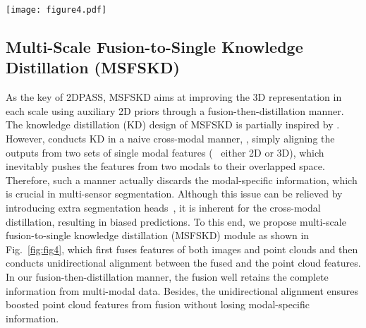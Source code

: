 \documentclass[runningheads]{llncs}
\begin{document}
	
	\begin{figure*}[t]
		\begin{centering}
			\texttt{[image: figure4.pdf]}
			\caption{Internal structure of \textbf{Multi-Scale Fusion-to-Single Knowledge Distillation (MSFSKD)}, which consists of the modality fusion and Modality-Preserving KD. For each scale, modality fusion is first ultilized to achieve an enhanced multi-modality feature $\hat{F}^{2D3D_e}_l$. Afterwards, the enhanced feature $\hat{F}^{2D3D_e}_l$ promotes the 3D representation $\hat{F}^{3D_{e}}_l$ through the uni-directional Modality-Preserving KD.
			}
			\label{fig:fig4}
		\end{centering}	
	\end{figure*}
	
	
	
	
	\subsection{Multi-Scale Fusion-to-Single Knowledge Distillation (MSFSKD)}
	\label{sec:ms}
	As the key of 2DPASS, MSFSKD aims at improving the 3D representation in each scale using auxiliary 2D priors through a fusion-then-distillation manner.
The knowledge distillation (KD) design of MSFSKD is partially inspired by \cite{jaritz2020xmuda}.
However, \cite{jaritz2020xmuda} conducts KD in a naive cross-modal manner, \ie, simply aligning the outputs from two sets of single modal features (\ie~ either 2D or 3D), which inevitably pushes the features from two modals to their overlapped space.
Therefore, such a manner actually discards the modal-specific information, which is crucial in multi-sensor segmentation.
Although this issue can be relieved by introducing extra segmentation heads~\cite{jaritz2020xmuda}, it is inherent for the cross-modal distillation, resulting in biased predictions.
To this end, we propose multi-scale fusion-to-single knowledge distillation (MSFSKD) module as shown in Fig.~\ref{fig:fig4}, which first fuses features of both images and point clouds and then conducts unidirectional alignment between the fused and the point cloud features.
In our fusion-then-distillation manner, the fusion well retains the complete information from multi-modal data.
Besides, the unidirectional alignment ensures boosted point cloud features from fusion without losing modal-specific information.
\end{document}
